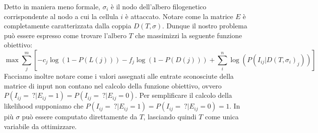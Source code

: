 \documentclass{report}
\begin{document}
  Detto in maniera meno formale, ${\sigma}_{i}$ è il nodo dell'albero filogenetico corrispondente al nodo a cui la cellula $i$ è attaccato. Notare come la matrice $E$ è completamente caratterizzata dalla coppia $D(T, \sigma)$. Dunque il nostro problema può essere espresso come trovare l'albero $T$ che massimizzi la seguente funzione obiettivo:
  \[
    \max{\sum_{j}^{m}[-c_{j}\log(1-P(L(j)))-f_{j}\log(1-P(D(j)))+\sum_{i}^{n}\log(P(I_{ij}|D(T, \sigma_{i})_{j}))]}
  \]
  Facciamo inoltre notare come i valori assegnati alle entrate sconosciute della matrice di input non contano nel calcolo della funzione obiettivo, ovvero $P(I_{ij}=\ ?|E_{ij}=1)=P(I_{ij}=\ ?|E_{ij}=0)$. Per semplificare il calcolo della likelihood supponiamo che $P(I_{ij}=\ ?|E_{ij}=1)=P(I_{ij}=\ ?|E_{ij}=0)=1$.
  In più $\sigma$ può essere computato direttamente da $T$, lasciando quindi $T$ come unica variabile da ottimizzare.
\end{document}
